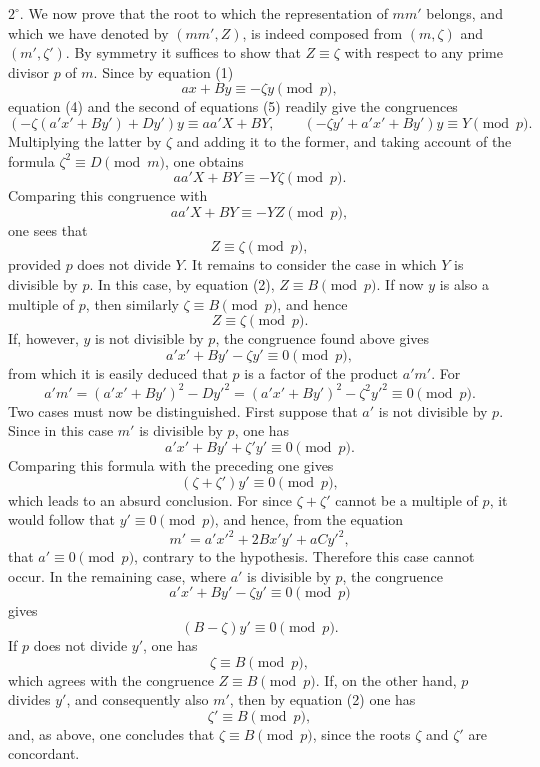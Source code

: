 \documentclass[11pt]{article}
\begin{document}
$2^\circ$. We now prove that the root to which the representation of $mm'$ belongs, and which we have denoted by $(mm',Z)$, is indeed composed from $(m,\zeta)$ and $(m',\zeta')$. By symmetry it suffices to show that $Z\equiv\zeta$ with respect to any prime divisor $p$ of $m$. Since by equation (1)
\[
 ax+By\equiv -\zeta y\pmod p,
\]
equation (4) and the second of equations (5) readily give the congruences
\[
 (-\zeta(a'x'+By')+Dy')y\equiv aa'X+BY,
 \qquad
 (-\zeta y'+a'x'+By')y\equiv Y\pmod p.
\]
Multiplying the latter by $\zeta$ and adding it to the former, and taking account of the formula $\zeta^2\equiv D\pmod m$, one obtains
\[
 aa'X+BY\equiv -Y\zeta\pmod p.
\]
Comparing this congruence with
\[
 aa'X+BY\equiv -YZ\pmod p,
\]
one sees that
\[
 Z\equiv\zeta\pmod p,
\]
provided $p$ does not divide $Y$. It remains to consider the case in which $Y$ is divisible by $p$. In this case, by equation (2), $Z\equiv B\pmod p$. If now $y$ is also a multiple of $p$, then similarly $\zeta\equiv B\pmod p$, and hence
\[
 Z\equiv\zeta\pmod p.
\]
If, however, $y$ is not divisible by $p$, the congruence found above gives
\[
 a'x'+By'-\zeta y'\equiv0\pmod p,
\]
from which it is easily deduced that $p$ is a factor of the product $a'm'$. For
\[
 a'm'=(a'x'+By')^2-Dy'^2=(a'x'+By')^2-\zeta^2y'^2\equiv0\pmod p.
\]
Two cases must now be distinguished. First suppose that $a'$ is not divisible by $p$. Since in this case $m'$ is divisible by $p$, one has
\[
 a'x'+By'+\zeta'y'\equiv0\pmod p.
\]
Comparing this formula with the preceding one gives
\[
 (\zeta+\zeta')y'\equiv0\pmod p,
\]
which leads to an absurd conclusion. For since $\zeta+\zeta'$ cannot be a multiple of $p$, it would follow that $y'\equiv0\pmod p$, and hence, from the equation
\[
 m'=a'x'^2+2Bx'y'+aCy'^2,
\]
that $a'\equiv0\pmod p$, contrary to the hypothesis. Therefore this case cannot occur. In the remaining case, where $a'$ is divisible by $p$, the congruence
\[
 a'x'+By'-\zeta y'\equiv0\pmod p
\]
gives
\[
 (B-\zeta)y'\equiv0\pmod p.
\]
If $p$ does not divide $y'$, one has
\[
 \zeta\equiv B\pmod p,
\]
which agrees with the congruence $Z\equiv B\pmod p$. If, on the other hand, $p$ divides $y'$, and consequently also $m'$, then by equation (2) one has
\[
 \zeta'\equiv B\pmod p,
\]
and, as above, one concludes that $\zeta\equiv B\pmod p$, since the roots $\zeta$ and $\zeta'$ are concordant.
\end{document}
